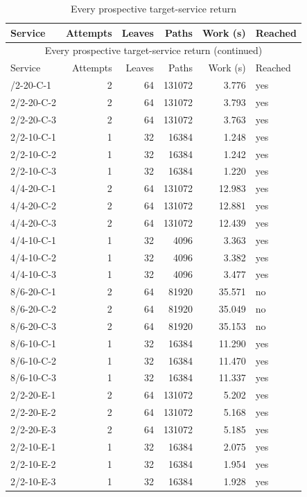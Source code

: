 \begingroup\small\setlength{\tabcolsep}{3pt}
\begin{longtable}{lrrrrl}
\caption{Every prospective target-service return}\label{tab:registry57}\\
\hline
Service & Attempts & Leaves & Paths & Work (s) & Reached \\
\hline
\endfirsthead
\multicolumn{6}{c}{Every prospective target-service return (continued)}\\
\hline
Service & Attempts & Leaves & Paths & Work (s) & Reached \\
\hline
\endhead
\hline
\endfoot
2/2-20-C-1 & 2 & 64 & 131072 & 3.776 & yes \\
2/2-20-C-2 & 2 & 64 & 131072 & 3.793 & yes \\
2/2-20-C-3 & 2 & 64 & 131072 & 3.763 & yes \\
2/2-10-C-1 & 1 & 32 & 16384 & 1.248 & yes \\
2/2-10-C-2 & 1 & 32 & 16384 & 1.242 & yes \\
2/2-10-C-3 & 1 & 32 & 16384 & 1.220 & yes \\
4/4-20-C-1 & 2 & 64 & 131072 & 12.983 & yes \\
4/4-20-C-2 & 2 & 64 & 131072 & 12.881 & yes \\
4/4-20-C-3 & 2 & 64 & 131072 & 12.439 & yes \\
4/4-10-C-1 & 1 & 32 & 4096 & 3.363 & yes \\
4/4-10-C-2 & 1 & 32 & 4096 & 3.382 & yes \\
4/4-10-C-3 & 1 & 32 & 4096 & 3.477 & yes \\
8/6-20-C-1 & 2 & 64 & 81920 & 35.571 & no \\
8/6-20-C-2 & 2 & 64 & 81920 & 35.049 & no \\
8/6-20-C-3 & 2 & 64 & 81920 & 35.153 & no \\
8/6-10-C-1 & 1 & 32 & 16384 & 11.290 & yes \\
8/6-10-C-2 & 1 & 32 & 16384 & 11.470 & yes \\
8/6-10-C-3 & 1 & 32 & 16384 & 11.337 & yes \\
2/2-20-E-1 & 2 & 64 & 131072 & 5.202 & yes \\
2/2-20-E-2 & 2 & 64 & 131072 & 5.168 & yes \\
2/2-20-E-3 & 2 & 64 & 131072 & 5.185 & yes \\
2/2-10-E-1 & 1 & 32 & 16384 & 2.075 & yes \\
2/2-10-E-2 & 1 & 32 & 16384 & 1.954 & yes \\
2/2-10-E-3 & 1 & 32 & 16384 & 1.928 & yes \\

\end{longtable}
